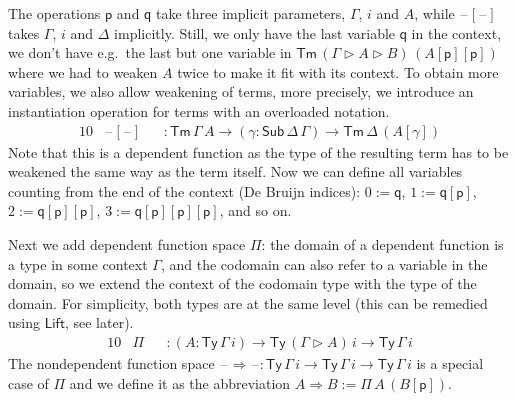 \documentclass[submission,copyright,creativecommons]{eptcs}
\newcommand{\ra}{\rightarrow}
\newcommand{\Ra}{\Rightarrow}
\newcommand{\Ty}{\mathsf{Ty}}
\newcommand{\Tm}{\mathsf{Tm}}
\newcommand{\Sub}{\mathsf{Sub}}
\newcommand{\p}{\mathsf{p}}
\newcommand{\q}{\mathsf{q}}
\newcommand{\ext}{\mathop{\triangleright}}
\newcommand{\blank}{\mathord{\hspace{1pt}\text{--}\hspace{1pt}}} %
\newcommand{\Lift}{\mathsf{Lift}}
\begin{document}
The operations $\p$ and $\q$ take three implicit parameters, $\Gamma$,
$i$ and $A$, while $\blank[\blank]$ takes $\Gamma$, $i$ and $\Delta$
implicitly. Still, we only have the last variable $\q$ in the context,
we don't have e.g.\ the last but one variable in $\Tm\,(\Gamma\ext
A\ext B)\,(A[\p][\p])$ where we had to weaken $A$ twice to make it fit
with its context. To obtain more variables, we also allow weakening of
terms, more precisely, we introduce an instantiation operation for
terms with an overloaded notation.
\begin{alignat*}{10}
& \blank[\blank] && : \Tm\,\Gamma\,A\ra(\gamma:\Sub\,\Delta\,\Gamma)\ra\Tm\,\Delta\,(A[\gamma])
\end{alignat*}
Note that this is a dependent function as the type of the resulting
term has to be weakened the same way as the term itself. Now we can
define all variables counting from the end of the context (De Bruijn
indices): $0 := \q$, $1 := \q[\p]$, $2 := \q[\p][\p]$,
$3 := \q[\p][\p][\p]$, and so on.

Next we add dependent function space $\Pi$: the domain of a dependent
function is a type in some context $\Gamma$, and the codomain can also
refer to a variable in the domain, so we extend the context of the
codomain type with the type of the domain. For simplicity, both types
are at the same level (this can be remedied using $\Lift$, see later).
\begin{alignat*}{10}
& \Pi && : (A:\Ty\,\Gamma\,i)\ra\Ty\,(\Gamma\ext A)\,i\ra\Ty\,\Gamma\,i
\end{alignat*}
The nondependent function space $\blank\Ra\blank :
\Ty\,\Gamma\,i\ra\Ty\,\Gamma\,i\ra\Ty\,\Gamma\,i$ is a special case of $\Pi$
and we define it as the abbreviation $A\Ra B := \Pi\,A\,(B[\p])$.
\end{document}
